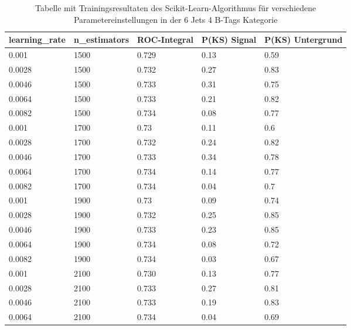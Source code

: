 \begin{table}[tbp]\parbox{12cm}{
  \caption[Scikit-Learn 6j4t Ergebnisse]{Tabelle mit Trainingsresultaten des Scikit-Learn-Algorithmus f\"ur verschiedene Parametereinstellungen in der 6 Jets 4 B-Tags Kategorie}%
  }\label{tab:sklearn_6j4t}
  \begin{center}
  \begin{tabular}{lllll}
  \hline
  learning\_rate & n\_estimators & ROC-Integral & P(KS) Signal & P(KS) Untergrund\\
  \hline
\num{0,001}  & \num{1500} & \num{0,729} & \num{0,13} & \num{0,59}\\
\num{0,0028} & \num{1500} & \num{0,732} & \num{0,27} & \num{0,83}\\
\num{0,0046} & \num{1500} & \num{0,733} & \num{0,31} & \num{0,75}\\
\num{0,0064} & \num{1500} & \num{0,733} & \num{0,21} & \num{0,82}\\
\num{0,0082} & \num{1500} & \num{0,734} & \num{0,08} & \num{0,77}\\
\num{0,001}  & \num{1700} & \num{0,73}  & \num{0,11} & \num{0,6}\\
\num{0,0028} & \num{1700} & \num{0,732} & \num{0,24} & \num{0,82}\\
\num{0,0046} & \num{1700} & \num{0,733} & \num{0,34} & \num{0,78}\\
\num{0,0064} & \num{1700} & \num{0,734} & \num{0,14} & \num{0,77}\\
\num{0,0082} & \num{1700} & \num{0,734} & \num{0,04} & \num{0,7}\\
\num{0,001}  & \num{1900} & \num{0,73}  & \num{0,09} & \num{0,74}\\
\num{0,0028} & \num{1900} & \num{0,732} & \num{0,25} & \num{0,85}\\
\num{0,0046} & \num{1900} & \num{0,733} & \num{0,23} & \num{0,85}\\
\num{0,0064} & \num{1900} & \num{0,734} & \num{0,08} & \num{0,72}\\
\num{0,0082} & \num{1900} & \num{0,734} & \num{0,03} & \num{0,67}\\
\num{0,001}  & \num{2100} & \num{0,730} & \num{0,13} & \num{0,77}\\
\num{0,0028} & \num{2100} & \num{0,733} & \num{0,27} & \num{0,81}\\
\num{0,0046} & \num{2100} & \num{0,733} & \num{0,19} & \num{0,83}\\
\num{0,0064} & \num{2100} & \num{0,734} & \num{0,04} & \num{0,69}\\

\end{tabular}
\end{center}
\end{table}
